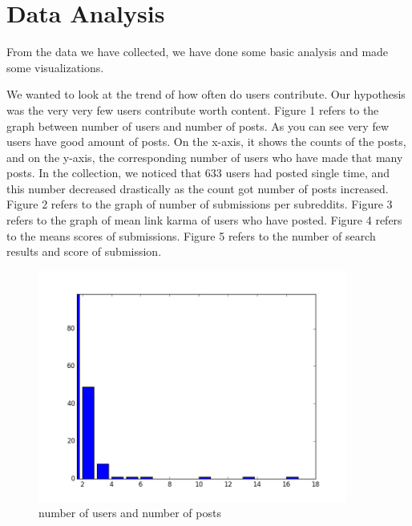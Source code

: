 \documentclass{article} %
\begin{document}
\section{Data Analysis}

From the data we have collected, we have done some basic analysis and made some visualizations.

We wanted to look at the trend of how often do users contribute. Our hypothesis was the very very few users contribute worth content. Figure 1 refers to the graph between number of users and number of posts. As you can see very few users have good amount of posts. On the x-axis, it shows the counts of the posts, and on the y-axis, the corresponding number of users who have made that many posts. In the collection, we noticed that 633 users had posted single time, and this number decreased drastically as the count got number of posts increased. Figure 2 refers to the graph of number of submissions per subreddits. Figure 3 refers to the graph of mean link karma of users who have posted. Figure 4 refers to the means scores of submissions. Figure 5 refers to the number of search results and score of submission.

\begin{figure}[h]
\begin{center}
\includegraphics[width=4in]{user.png}
\caption{number of users and number of posts}
\end{center}
\end{figure}
\end{document}
